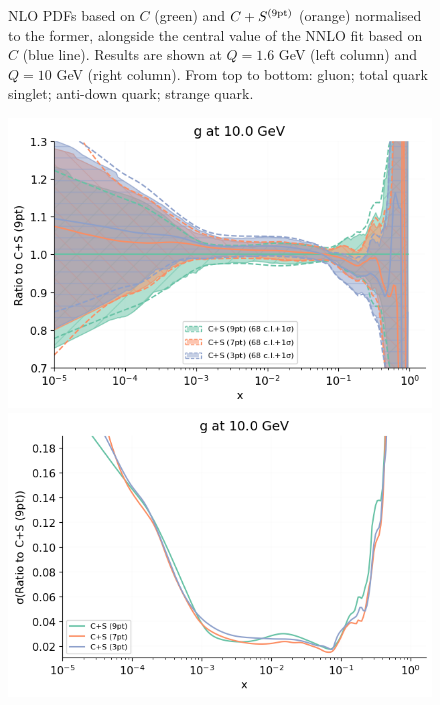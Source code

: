 \begin{figure}[H]
\begin{center}
   \caption{\small NLO PDFs based on $C$ (green) and $C+S^{\rm (9pt)}$ (orange) normalised
     to the former, alongside the central value of the NNLO fit based on $C$ (blue line).
     Results are shown at $Q=1.6$ GeV (left column) and $Q=10$ GeV (right column). From top to bottom: gluon; total quark singlet;
     anti-down quark; strange quark.
    \label{fig:Global-NLO-CovMatTH} }
  \end{center}
\end{figure}
\begin{figure}[H]
  \begin{center}
    \includegraphics[scale=0.45]{mhous/plots/jplots/j2g.png}
    \includegraphics[scale=0.45]{mhous/plots/jplots/jeg.png}

\end{center}
\end{figure}
